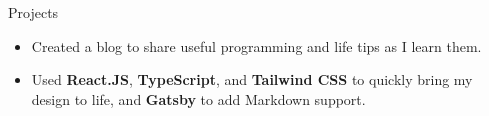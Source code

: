\documentclass{resume} %
\begin{document}
\begin{workSection}{Projects}
	
	\customItem[
		title=\href{https://blog.ashkan.zone/}{blog.ashkan.zone \faExternalLink},
		duration=August 2024,
	]
	\begin{itemize}
		\vspace{-0.5em}
		\itemsep -6pt {}
		\item Created a blog to share useful programming and life tips as I learn them.
		\item Used \textbf{React.JS}, \textbf{TypeScript}, and \textbf{Tailwind CSS} to quickly bring my design to life, and \textbf{Gatsby} to add Markdown support.
	\end{itemize}
	
	
	

\end{workSection}
\end{document}
